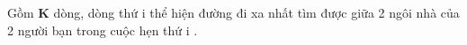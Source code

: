 Gồm \textbf{ K } dòng, dòng thứ i thể hiện đường đi xa nhất tìm được giữa 2 ngôi nhà của 2 người bạn trong cuộc hẹn thứ i .